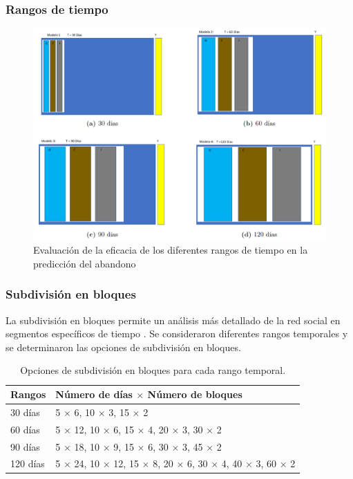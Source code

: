 \documentclass{beamer}
\begin{document}
\begin{frame}
	\frametitle{Rangos de tiempo}
	\begin{figure}
		\centering
		\includegraphics[width=0.7\linewidth]{figs/fig1}
		\caption{Evaluación de la eficacia de los diferentes rangos de tiempo en la predicción del abandono}
		\label{fig:fig1}
	\end{figure}
\end{frame}


\begin{frame}
	\frametitle{Subdivisión en bloques}
	La subdivisión en bloques permite un análisis más detallado de la red social en segmentos específicos de tiempo \citep{kim2012a}. Se consideraron diferentes rangos temporales y se determinaron las opciones de subdivisión en bloques. 
	\begin{table}[H]
		\centering
		\begin{tabular}{ll}
			\toprule
			Rangos & Número de días $\times$ Número de bloques \\
			\midrule
			30 días & 5 $\times$ 6, 10 $\times$ 3, 15 $\times$ 2 \\
			60 días & 5 $\times$ 12, 10 $\times$ 6, 15 $\times$ 4, 20 $\times$ 3, 30 $\times$ 2 \\
			90 días & 5 $\times$ 18, 10 $\times$ 9, 15 $\times$ 6, 30 $\times$ 3, 45 $\times$ 2 \\
			120 días & 5 $\times$ 24, 10 $\times$ 12, 15 $\times$ 8, 20 $\times$ 6, 30 $\times$ 4, 40 $\times$ 3, 60 $\times$ 2 \\
			\bottomrule
		\end{tabular}
		\caption{Opciones de subdivisión en bloques para cada rango temporal.}
		
		\label{tab:subdivision-bloques1}
	\end{table}

\end{frame}
\end{document}
